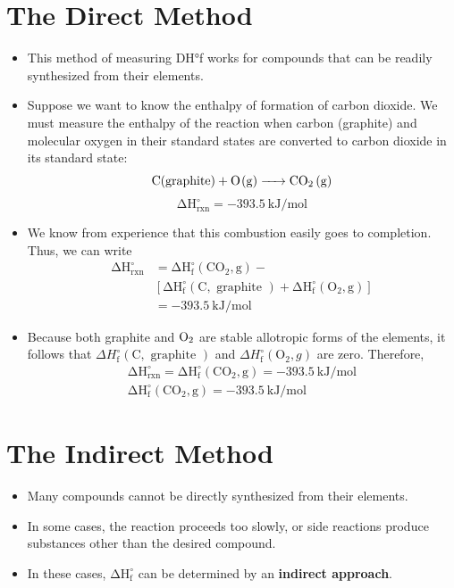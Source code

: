 \documentclass[a4paper,12pt,twocolumn]{article}
\begin{document}
\section{The Direct Method}
\begin{itemize}
\item This method of measuring DH°f works for compounds that can be readily synthesized from their elements. 
\item Suppose we want to know the enthalpy of formation of carbon dioxide. We must measure the enthalpy of the reaction when carbon (graphite) and molecular oxygen in their standard states are converted to carbon dioxide in its standard state:
$$\ce{C(graphite) + O(g) -> CO2 (g)}$$
$$ \mathrm{\Delta H_{\mathrm{rxn}}^{\circ}=-393.5 \mathrm{~kJ} / \mathrm{mol}}$$
\item We know from experience that this combustion easily goes to completion. Thus, we can write
$$\begin{aligned}
\mathrm{\Delta H_{\mathrm{rxn}}^{\circ}} & \mathrm{=\Delta H_{\mathrm{f}}^{\circ}\left(\mathrm{CO}_{2}, g\right) -}\\ 
& \mathrm{\left[\Delta H_{\mathrm{f}}^{\circ}(\mathrm{C}, \text { graphite })+\Delta H_{\mathrm{f}}^{\circ}\left(\mathrm{O}_{2}, g\right)\right]} \\
& \mathrm{=-393.5 \mathrm{~kJ} / \mathrm{mol}}
\end{aligned}$$
\item Because both graphite and $\ce{O2}$ are stable allotropic forms of the elements, it follows that $\Delta H_{\mathrm{f}}^{\circ}(\mathrm{C}, \text { graphite })$ and $\Delta H_{\mathrm{f}}^{\circ}\left(\mathrm{O}_{2}, g\right)$ are zero. Therefore,
$$\begin{array}{c}
\mathrm{\Delta H_{\mathrm{rxn}}^{\circ}=\Delta H_{\mathrm{f}}^{\circ}\left(\mathrm{CO}_{2}, g\right)=-393.5 \mathrm{~kJ} / \mathrm{mol}} \\
\mathrm{\Delta H_{\mathrm{f}}^{\circ}\left(\mathrm{CO}_{2}, g\right)=-393.5 \mathrm{~kJ} / \mathrm{mol}}
\end{array}$$
\end{itemize}

\section{The Indirect Method}
\begin{itemize}
\item Many compounds cannot be directly synthesized from their elements. 
\item In some cases, the reaction proceeds too slowly, or side reactions produce substances other than the desired compound. 
\item In these cases, $\mathrm{\Delta H_{\mathrm{f}}^{\circ}}$  can be determined by an \textbf{ indirect approach}.
\end{itemize}
\end{document}

